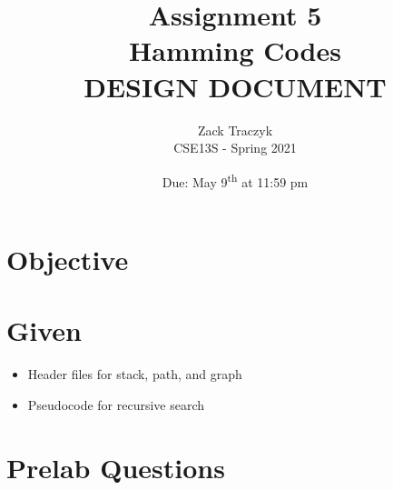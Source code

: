 \documentclass[12pt]{article}
\title{%
	\textbf{Assignment 5 \\ 
	Hamming Codes \\
	\large DESIGN DOCUMENT} }
\author{Zack Traczyk \\ CSE13S - Spring 2021}
\date{Due: May 9\textsuperscript{th} at 11:59 pm}
\begin{document}
\maketitle

\section{Objective}


\section{Given}

\begin{itemize}
	\item{Header files for stack, path, and graph}
	\item{Pseudocode for recursive search}
\end{itemize}


\section{Prelab Questions}
\end{document}
